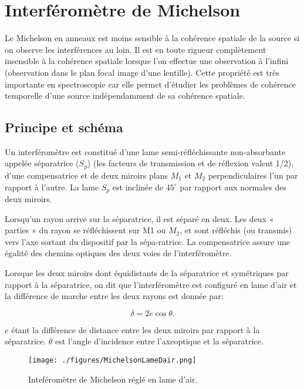 \documentclass[french]{article}
\begin{document}
\section{Interféromètre de Michelson}
Le Michelson en anneaux est moins sensible à la cohérence spatiale de la source si on observe les interférences au loin. Il est en toute rigueur complètement insensible à la cohérence spatiale lorsque l'on effectue une observation à l'infini (observation dans le plan focal image d'une lentille). Cette propriété est très importante en spectroscopie car elle permet d'étudier les problèmes de cohérence temporelle d'une source indépendamment de sa cohérence spatiale. 

\subsection{Principe et schéma}

Un interféromètre est constitué d'une lame semi-réfléchissante non-absorbante appelée séparatrice ($S_p$) (les facteurs de transmission et de réflexion valent 1/2), d'une compensatrice et de deux miroirs plans $M_1$ et $M_2$ perpendiculaires l'un par rapport à l'autre. La lame $S_p$ est inclinée de $45^{\circ}$ par rapport aux normales des deux miroirs.\gap


Lorsqu’un rayon arrive sur la séparatrice, il est séparé en deux. Les deux « parties » du rayon se réfléchissent sur M1 ou $M_2$, et sont réfléchis (ou transmis) vers l’axe sortant du dispositif par la sépa-ratrice. La compensatrice assure une égalité des chemins optiques des deux voies de l’interféromètre.\gap

Lorsque les deux miroirs dont équidistants de la séparatrice  et symétriques par rapport à la séparatrice, on dit que l'interféromètre est configuré en lame d'air et la différence de marche entre les deux rayons est donnée par: 

\begin{equation}
	\delta = 2e\cos{\theta}.
\end{equation}

$e$ étant la différence de distance entre les deux miroirs par rapport à la séparatrice. $\theta$ est l'angle d'incidence entre l'axeoptique et la séparatrice.

\begin{figure}[!ht] 
	\centering
	\texttt{[image: ./figures/MichelsonLameDair.png]}
	\caption{Inteféromètre de Michelson réglé en lame d'air.}
\end{figure}
\end{document}
